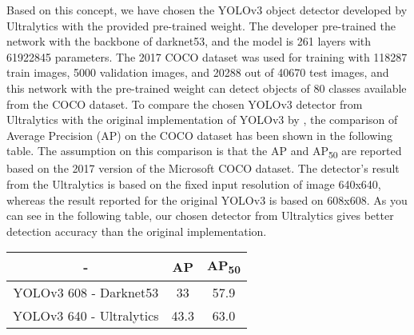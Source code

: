 Based on this concept, we have chosen the YOLOv3 object detector developed by Ultralytics \cite{jocher_ultralyticsyolov3_2021} with the provided pre-trained weight. The developer \citeauthor{jocher_ultralyticsyolov3_2021} pre-trained the network with the backbone of darknet53, and the model is 261 layers with 61922845 parameters. The 2017 COCO dataset was used for training with 118287 train images, 5000 validation images, and 20288 out of 40670 test images, and this network with the pre-trained weight can detect objects of 80 classes available from the COCO dataset. To compare the chosen YOLOv3 detector from Ultralytics with the original implementation of YOLOv3 by \citeauthor{redmon_yolov3_2018}, the comparison of Average Precision (AP) on the COCO dataset has been shown in the following table. The assumption on this comparison is that the AP and AP\textsubscript{50} are reported based on the 2017 version of the Microsoft COCO dataset. The detector's result from the Ultralytics is based on the fixed input resolution of image 640x640, whereas the result reported for the original YOLOv3 is based on 608x608. As you can see in the following table, our chosen detector from Ultralytics gives better detection accuracy than the original implementation.
\begin{center}
 \begin{tabular}{||c | c c||} 
 \hline
  - & AP & AP\textsubscript{50} \\ [0.5ex]
 \hline\hline
  YOLOv3 608 - Darknet53 & 33 & 57.9\\ 
 \hline
 YOLOv3 640 - Ultralytics & 43.3 & 63.0 \\
 \hline
\end{tabular}
\end{center}
